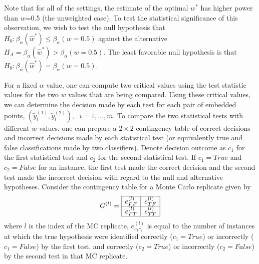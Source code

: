 \documentclass[11pt]{article} %
\begin{document}

Note that  for all of the settings, the estimate of the optimal $w^{*}$ has  higher power than $w$=0.5 (the unweighted case).
To test the statistical significance of this observation, we wish to test the null hypothesis that  $H_{0}: \beta_{\alpha}({\hat{w}^*})\leq\beta_{\alpha}({w=0.5})$ against the alternative $H_{A}=\beta_{\alpha}({\hat{w}^*})>\beta_{\alpha}({w=0.5})$.  The least favorable null hypothesis is that  $H_{0}: \beta_{\alpha}({\hat{w}^*})=\beta_{\alpha}({w=0.5})$.

For a fixed $\alpha$ value, one can compute two critical values  using the test statistic values for the two $w$ values that are being compared. Using these critical  values, we can  determine the decision made by each test for each pair of embedded points, $(\tilde{y}_i^{(1)},\tilde{y}_i^{(2)}),\hspace{7pt}i=1,\ldots,m$. To compare the  two statistical tests with different $w$ values, one can prepare a $2\times 2$ contingency-table of correct decisions and incorrect decisions made by each statistical test (or equivalently true and false classifications made by two classifiers). Denote decision outcome as $c_1$ for the first statistical test and $c_2$ for the second statistical test. If $c_1=True$ and $c_2=False$ for an instance,  the first test made the correct decision and the second test made the incorrect decision with regard to the null and alternative hypotheses.
Consider the contingency table for a Monte Carlo replicate given by $$G^{(l)}= \begin{array}{|c|c|}
      \hline
       e_{FF}^{(l)} & e_{TF}^{(l)}\\
      \hline
       e_{FT}^{(l)} & e_{TT}^{(l)}\\
      \hline
      \end{array}      $$  where $l$ is the index of the MC replicate, $e_{c_1c_2}^{(l)}$ is equal to the number of instances at which the true hypothesis were identified  correctly ($c_1=True$) or incorrectly ($c_1=False$) by the first test, and correctly ($c_2=True$) or incorrectly ($c_2=False$) by the second test in that MC replicate.
\end{document}
